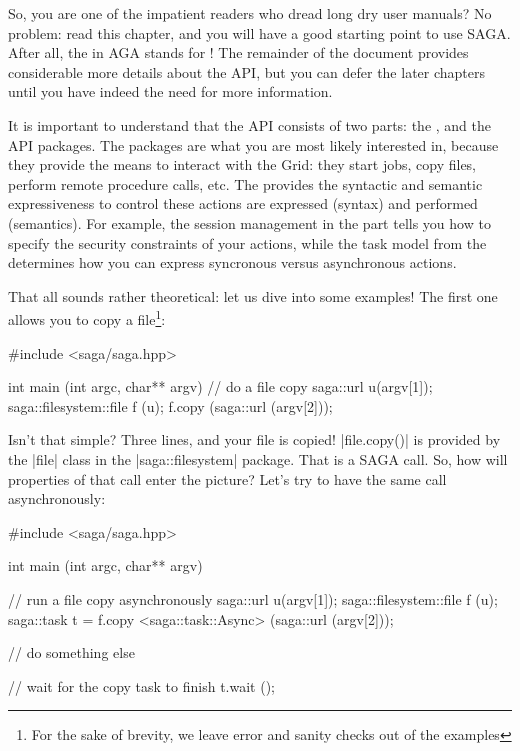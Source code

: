 
 So, you are one of the impatient readers who dread long dry user
 manuals?  No problem: read this chapter, and you will have a good
 starting point to use SAGA.  After all, the  in AGA stands
 for !  The remainder of the document provides considerable
 more details about the API, but you can defer the later chapters until
 you have indeed the need for more information.


  It is important to understand that the API consists of two parts:
  the \LF, and the API packages.  The packages are what you are most
  likely interested in, because they provide the means to interact with the
  Grid: they start jobs, copy files, perform remote procedure calls, etc.
  The \LF provides the syntactic and semantic expressiveness to
  control  these actions are expressed (syntax) and performed
  (semantics).  For example, the session management in the \LF part
  tells you how to specify the security constraints of your actions,
  while the task model from the \LF determines how you can express
  syncronous versus asynchronous actions.

  That all sounds rather theoretical: let us dive into some examples!
  The first one allows you to copy a file\footnote{For the sake of brevity, we leave error and sanity checks out of the examples}:

  \begin{mycode}[label=File copy]
  #include <saga/saga.hpp>

  int main (int argc, char** argv)
  {
    // do a file copy
    saga::url u(argv[1]);
    saga::filesystem::file f (u);
    f.copy (saga::url (argv[2]));
  }
  \end{mycode}

  Isn't that simple?  Three lines, and your file is copied!
  |file.copy()| is provided by the |file| class in the
  |saga::filesystem| package.  That is a  SAGA call.
  So, how will  properties of that call enter the
  picture?  Let's try to have the same call asynchronously:

  \begin{mycode}[label=File copy (async version)]
  #include <saga/saga.hpp>

  int main (int argc, char** argv)
  {
    // run a file copy asynchronously
    saga::url u(argv[1]);
    saga::filesystem::file f (u);
    saga::task t = f.copy <saga::task::Async> (saga::url (argv[2]));

    // do something else

    // wait for the copy task to finish
    t.wait ();
  }
  \end{mycode}

